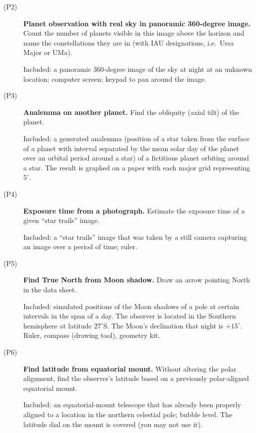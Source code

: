 \begin{description}
\item[(P2)] \textbf{Planet observation with real sky in panoramic 360-degree
  image.} Count the number of planets visible in this image above the horizon
  and name the constellations they are in (with IAU designations, i.e.\ Ursa
  Major or UMa).

  Included: a panoramic 360-degree image of the sky at night at an unknown
  location; computer screen; keypad to pan around the image.

\item[(P3)] \textbf{Analemma on another planet.} Find the obliquity (axial
  tilt) of the planet.

  Included: a generated analemma (position of a star taken from the surface of
  a planet with interval separated by the mean solar day of the planet over an
  orbital period around a star) of a fictitious planet orbiting around a star.
  The result is graphed on a paper with each major grid representing
  $5^\circ$.

\item[(P4)] \textbf{Exposure time from a photograph.} Estimate the exposure
  time of a given ``star trails'' image.

  Included: a ``star trails'' image that was taken by a still camera capturing
  an image over a period of time; ruler.

\item[(P5)] \textbf{Find True North from Moon shadow.} Draw an arrow pointing
  North in the data sheet.

  Included: simulated positions of the Moon shadows of a pole at certain
  intervals in the span of a day. The observer is located in the Southern
  hemisphere at latitude $27^\circ$S. The Moon's declination that night is
  $+15^\circ$. Ruler, compass (drawing tool), geometry kit.

\item[(P6)] \textbf{Find latitude from equatorial mount.} Without altering the
  polar alignment, find the observer's latitude based on a previously
  polar-aligned equatorial mount.

  Included: an equatorial-mount telescope that has already been properly
  aligned to a location in the northern celestial pole; bubble level. The
  latitude dial on the mount is covered (you may not use it).


\end{description}
